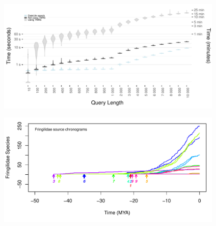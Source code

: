 \documentclass[]{article}
\begin{document}
\begin{figure}[!h]
\includegraphics[width=1\linewidth]{fig_runtime1.pdf}
\caption{}
\label{fig:runtime1}
\end{figure}

\newpage

\begin{figure}[!h]
\includegraphics[width=1\linewidth]{fig_schronograms1.pdf}
\caption{}
\label{fig:schronograms}
\end{figure}

\newpage
\end{document}
